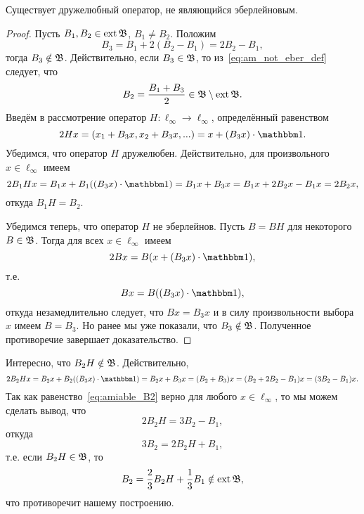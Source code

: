 \begin{theorem}
	\label{thm:amiable_but_not_Eberlein_exists}
	Существует дружелюбный оператор, не являющийся эберлейновым.
\end{theorem}

\begin{proof}
	Пусть $B_1, B_2 \in \operatorname{ext} \mathfrak{B}$, $B_1 \ne B_2$.
	Положим
	\begin{equation}
		\label{eq:am_not_eber_def}
		B_3 = B_1 + 2(B_2-B_1) = 2B_2-B_1,
	\end{equation}
	тогда $B_3 \notin \mathfrak{B}$.
	Действительно, если $B_3 \in \mathfrak{B}$, то из~\eqref{eq:am_not_eber_def} следует, что
	\begin{equation}
		B_2 = \frac{B_1 + B_3}2 \in \mathfrak{B} \setminus \operatorname{ext} \mathfrak{B}
		.
	\end{equation}
	Введём в рассмотрение оператор $H:\ell_\infty\to\ell_\infty$, определённый равенством
	\begin{equation}
		2Hx = (x_1 + B_3x, x_2 + B_3x, ...) = x + (B_3 x) \cdot \one
		.
	\end{equation}
	Убедимся, что оператор $H$ дружелюбен.
	Действительно, для произвольного $x\in\ell_\infty$ имеем
	\begin{equation}
		2 B_1 H x = B_1 x + B_1 ((B_3 x) \cdot\one) = B_1 x + B_3 x =
		B_1 x + 2 B_2 x - B_1 x = 2B_2 x
		,
	\end{equation}
	откуда $B_1 H = B_2$.

	Убедимся теперь, что оператор $H$ не эберлейнов.
	Пусть $B = BH$ для некоторого $B\in\mathfrak{B}$.
	Тогда для всех $x\in\ell_\infty$ имеем
	\begin{equation}
		2Bx = B (x + (B_3 x) \cdot \one)
		,
	\end{equation}
	т.е.
	\begin{equation}
		Bx =  B((B_3 x) \cdot \one)
		,
	\end{equation}
	откуда незамедлительно следует, что $Bx = B_3x$ и в силу произвольности выбора $x$ имеем $B=B_3$.
	Но ранее мы уже показали, что $B_3\notin \mathfrak{B}$.
	Полученное противоречие завершает доказательство.
\end{proof}

\begin{remark}
	Интересно, что $B_2H\notin \mathfrak{B}$.
	Действительно,
	\begin{equation}
		\label{eq:amiable_B2}
		2B_2 H x = B_2 x + B_2((B_3 x)\cdot \one) = B_2 x + B_3 x  =
		(B_2 + B_3) x  = (B_2+2B_2-B_1)x = (3B_2-B_1)x
		.
	\end{equation}
	Так как равенство~\eqref{eq:amiable_B2} верно для любого $x\in\ell_\infty$,
	то мы можем сделать вывод, что
	\begin{equation}
		2B_2H = 3B_2-B_1
		,
	\end{equation}
	откуда
	\begin{equation}
		3B_2 = 2B_2H  + B_1
		,
	\end{equation}
	т.е. если $B_2H\in\mathfrak{B}$, то
	\begin{equation}
		B_2 = \frac23 B_2H  + \frac13 B_1 \notin \operatorname{ext}\mathfrak{B}
		,
	\end{equation}
	что противоречит нашему построению.
\end{remark}

